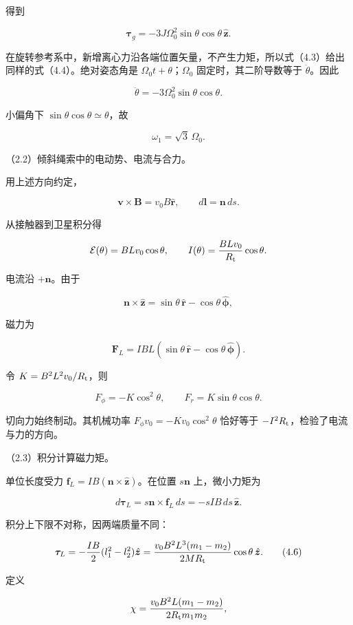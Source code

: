 \documentclass[12pt,a4paper,fontset=fandol]{ctexart}
\begin{document}
得到

\[
\boldsymbol\tau_g=-3J\Omega_0^2\sin\theta\cos\theta\,\hat{\boldsymbol z}.
\tag{4.4}
\]

在旋转参考系中，新增离心力沿各端位置矢量，不产生力矩，所以式（4.3）给出同样的式（4.4）。绝对姿态角是
\(\Omega_0t+\theta\)；\(\Omega_0\) 固定时，其二阶导数等于
\(\ddot\theta\)。因此

\[
\ddot\theta=-3\Omega_0^2\sin\theta\cos\theta.
\]

小偏角下 \(\sin\theta\cos\theta\simeq\theta\)，故

\[
\boxed{\omega_1=\sqrt3\,\Omega_0.}
\]

（2.2）倾斜绳索中的电动势、电流与合力。

用上述方向约定，

\[
\boldsymbol v\times\boldsymbol B=v_0B\hat{\boldsymbol r},
\qquad
d\boldsymbol l=\boldsymbol n\,ds.
\]

从接触器到卫星积分得

\[
\mathcal E(\theta)=BLv_0\cos\theta,\qquad
I(\theta)=\frac{BLv_0}{R_{\rm t}}\cos\theta.
\]

电流沿 \(+\boldsymbol n\)。由于

\[
\boldsymbol n\times\hat{\boldsymbol z}
=\sin\theta\,\hat{\boldsymbol r}-\cos\theta\,\hat{\boldsymbol\phi},
\]

磁力为

\[
\boldsymbol F_L=IBL
(\sin\theta\,\hat{\boldsymbol r}-\cos\theta\,\hat{\boldsymbol\phi}).
\]

令 \(K=B^2L^2v_0/R_{\rm t}\)，则

\[
\boxed{F_\phi=-K\cos^2\theta,\qquad
F_r=K\sin\theta\cos\theta.}
\tag{4.5}
\]

切向力始终制动。其机械功率 \(F_\phi v_0=-K v_0\cos^2\theta\) 恰好等于
\(-I^2R_{\rm t}\)，检验了电流与力的方向。

（2.3）积分计算磁力矩。

单位长度受力
\(\boldsymbol f_L=IB(\boldsymbol n\times\hat{\boldsymbol z})\)。在位置
\(s\boldsymbol n\) 上，微小力矩为

\[
d\boldsymbol\tau_L=s\boldsymbol n\times\boldsymbol f_L\,ds
=-sIB\,ds\,\hat{\boldsymbol z}.
\]

积分上下限不对称，因两端质量不同：

\[
\boldsymbol\tau_L
=-\frac{IB}{2}(l_1^2-l_2^2)\hat{\boldsymbol z}
=\frac{v_0B^2L^3(m_1-m_2)}{2MR_{\rm t}}
\cos\theta\,\hat{\boldsymbol z}.
\tag{4.6}
\]

定义

\[
\chi=\frac{v_0B^2L(m_1-m_2)}{2R_{\rm t}m_1m_2},
\]
\end{document}
